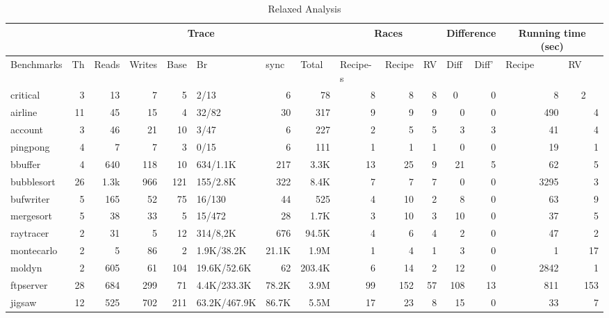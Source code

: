 \begin{table}[htbp]
\caption{Relaxed Analysis}
\begin{flushleft}
\begin{tabular}{|l|r|r|r|r|l|r|r|r|r|r|r|r|r|r|}
\hline
 & \multicolumn{ 7}{c|}{Trace} & \multicolumn{ 3}{c|}{Races} & \multicolumn{ 2}{c|}{Difference} & \multicolumn{ 2}{c|}{Running time (sec)} \\ \hline
Benchmarks & \multicolumn{1}{l|}{Th} & \multicolumn{1}{l|}{Reads} & \multicolumn{1}{l|}{Writes} & \multicolumn{1}{l|}{Base} & Br & \multicolumn{1}{l|}{sync} & \multicolumn{1}{l|}{Total} & \multicolumn{1}{l|}{Recipe-s} & \multicolumn{1}{l|}{Recipe} & \multicolumn{1}{l|}{RV} & \multicolumn{1}{l|}{Diff} & \multicolumn{1}{l|}{Diff'} & \multicolumn{1}{l|}{Recipe} & \multicolumn{1}{l|}{RV} \\ \hline
critical & 3 & 13 & 7 & 5 & 2/13 & 6 & 78 & 8 & 8 & 8 & \multicolumn{1}{c|}{0} & 0 & 8 & \multicolumn{1}{c|}{2} \\ \hline
airline & 11 & 45 & 15 & 4 & 32/82 & 30 & 317 & 9 & 9 & 9 & 0 & 0 & 490 & 4 \\ \hline
account & 3 & 46 & 21 & 10 & 3/47 & 6 & 227 & 2 & 5 & 5 & 3 & 3 & 41 & 4 \\ \hline
pingpong & 4 & 7 & 7 & 3 & 0/15 & 6 & 111 & 1 & 1 & 1 & 0 & 0 & 19 & 1 \\ \hline
bbuffer & 4 & 640 & 118 & 10 & 634/1.1K & 217 & 3.3K & 13 & 25 & 9 & 21 & 5 & 62 & 5 \\ \hline
bubblesort & 26 & 1.3k & 966 & 121 & 155/2.8K & 322 & 8.4K & 7 & 7 & 7 & 0 & 0 & 3295 & 3 \\ \hline
bufwriter & 5 & 165 & 52 & 75 & 16/130 & 44 & 525 & 4 & 10 & 2 & 8 & 0 & 63 & 9 \\ \hline
mergesort & 5 & 38 & 33 & 5 & 15/472 & 28 & 1.7K & 3 & 10 & 3 & 10 & 0 & 37 & 5 \\ \hline
raytracer & 2 & 31 & 5 & 12 & 314/8,2K & 676 & 94.5K & 4 & 6 & 4 & 2 & 0 & 47 & 2 \\ \hline
montecarlo & 2 & 5 & 86 & 2 & 1.9K/38.2K & 21.1K & 1.9M & 1 & 4 & 1 & 3 & 0 & 1 & 17 \\ \hline
moldyn & 2 & 605 & 61 & 104 & 19.6K/52.6K & 62 & 203.4K & 6 & 14 & 2 & 12 & 0 & 2842 & 1 \\ \hline
ftpserver & 28 & 684 & 299 & 71 & 4.4K/233.3K & 78.2K & 3.9M & 99 & 152 & 57 & 108 & 13 & 811 & 153 \\ \hline
jigsaw & 12 & 525 & 702 & 211 & 63.2K/467.9K & 86.7K & 5.5M & 17 & 23 & 8 & 15 & 0 & 33 & 7 \\ \hline

\end{tabular}
\end{flushleft}
\end{table}
